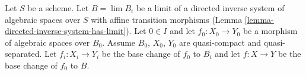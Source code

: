 \begin{situation}
\label{situation-descent-property}
Let $S$ be a scheme. Let $B = \lim B_i$ be a limit of a directed inverse system
of algebraic spaces over $S$ with affine transition morphisms
(Lemma \ref{lemma-directed-inverse-system-has-limit}).
Let $0 \in I$ and let $f_0 : X_0 \to Y_0$ be a morphism of algebraic spaces
over $B_0$. Assume $B_0$, $X_0$, $Y_0$ are quasi-compact and quasi-separated.
Let $f_i : X_i \to Y_i$ be the base change of $f_0$ to $B_i$ and
let $f : X \to Y$ be the base change of $f_0$ to $B$.
\end{situation}